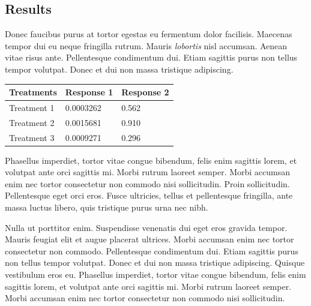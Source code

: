 \documentclass[a0,landscape]{a0poster}
\begin{document}
\begin{multicols}{4}

\section*{Results}

Donec faucibus purus at tortor egestas eu fermentum dolor facilisis. Maecenas tempor dui eu neque fringilla rutrum. Mauris \emph{lobortis} nisl accumsan. Aenean vitae risus ante. Pellentesque condimentum dui. Etiam sagittis purus non tellus tempor volutpat. Donec et dui non massa tristique adipiscing.
%
\begin{table} %
\begin{tabular}{l l l}
\toprule
\textbf{Treatments} & \textbf{Response 1} & \textbf{Response 2}\\
\midrule
Treatment 1 & 0.0003262 & 0.562 \\
Treatment 2 & 0.0015681 & 0.910 \\
Treatment 3 & 0.0009271 & 0.296 \\
\bottomrule
\end{tabular}
\end{table}
%
Phasellus imperdiet, tortor vitae congue bibendum, felis enim sagittis lorem, et volutpat ante orci sagittis mi. Morbi rutrum laoreet semper. Morbi accumsan enim nec tortor consectetur non commodo nisi sollicitudin. Proin sollicitudin. Pellentesque eget orci eros. Fusce ultricies, tellus et pellentesque fringilla, ante massa luctus libero, quis tristique purus urna nec nibh.

Nulla ut porttitor enim. Suspendisse venenatis dui eget eros gravida tempor. Mauris feugiat elit et augue placerat ultrices. Morbi accumsan enim nec tortor consectetur non commodo. Pellentesque condimentum dui. Etiam sagittis purus non tellus tempor volutpat. Donec et dui non massa tristique adipiscing. Quisque vestibulum eros eu. Phasellus imperdiet, tortor vitae congue bibendum, felis enim sagittis lorem, et volutpat ante orci sagittis mi. Morbi rutrum laoreet semper. Morbi accumsan enim nec tortor consectetur non commodo nisi sollicitudin.

\begin{center}\vspace{1cm}


\end{center}
\end{multicols}
\end{document}
